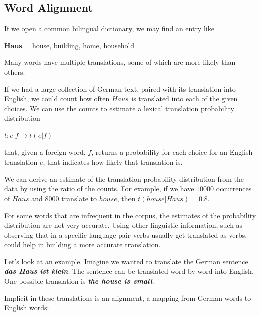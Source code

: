 \documentclass[10pt]{report}
\theoremstyle{plain}
\begin{document}
{\subsection{Word Alignment\\}

If we open a common bilingual dictionary, we may find an entry
like\\
\begin{center}
\textbf{Haus} = house, building, home, household\\
\end{center}
Many words have multiple translations, some of which are more likely
than others.

If we had a large collection of German text, paired with its
translation into English, we could count how often $Haus$ is
translated into each of the given choices. We can use the counts to
estimate a lexical translation probability distribution

\begin{center}
$t : e|f \rightarrow t(e|f)$
\end{center}

that, given a foreign word, $f$, returns a probability for each
choice for an English translation $e$, that indicates how likely
that translation is.


We can derive an estimate of the translation probability
distribution from the data by using the ratio of the counts. For
example, if we have $10000$ occurrences of $Haus$ and $8000$
translate to $house$, then $t(house|Haus)=0.8$.

For some words that are infrequent in the corpus, the estimates of
the probability distribution are not very accurate. Using other
linguistic information, such as observing that in a specific
language pair verbs usually get translated as verbs, could help in
building a more accurate translation.

Let's look at an example. Imagine we wanted to translate the German
sentence \textbf{\emph{das Haus ist klein}}. The sentence can be
translated word by word into English. One possible translation is
\textbf{\emph{the house is small}}.


Implicit in these translations is an alignment, a mapping from
German words to English words:

}
\end{document}
